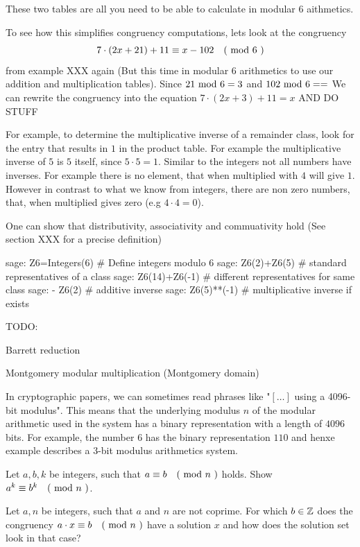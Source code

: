 \begin{example} 
These two tables are all you need to be able to calculate in modular $6$ aithmetics. 

To see how this simplifies congruency computations, lets look at the congruency 
$$7\cdot(2x+21) + 11 \equiv x-102 \quad \text{( mod } 6 \text{ )}$$
from example XXX again (But this time in modular $6$ arithmetics to use our addition and multiplication tables). Since $21 \text{ mod } 6= 3$ and $102 \text{ mod } 6= =$ We can rewrite the congruency into the equation 
$7\cdot(2x+3) + 11=x$
AND DO STUFF



For example, to determine the multiplicative inverse of a remainder class, look for the entry that results in $ 1 $ in the product table. For example the multiplicative inverse of $ 5 $ is $ 5 $ itself, since $5\cdot 5 = 1$. Similar to the integers not all numbers have inverses. For example there is no element, that when multiplied with $4$ will give $1$. 
However in contrast to what we know from integers, there are non zero numbers, that, when multiplied gives zero (e.g $4\cdot 4 =0$).

One can show that distributivity, associativity and commuativity hold (See section XXX for a precise definition)

\begin{sagecommandline}
sage: Z6=Integers(6) # Define integers modulo 6 
sage: Z6(2)+Z6(5) # standard representatives of a class
sage: Z6(14)+Z6(-1) # different representatives for same class
sage: - Z6(2) # additive inverse
sage: Z6(5)**(-1) # multiplicative inverse if exists
\end{sagecommandline}
\end{example}

TODO:

Barrett reduction

Montgomery modular multiplication (Montgomery domain)

\begin{jargon} In cryptographic papers, we can sometimes read phrases like "$[\ldots]$ using a 4096-bit modulus". This means that the underlying modulus $n$ of the modular arithmetic used in the system has a binary representation with a length of $4096$ bits. For example, the number $6$ has the binary representation $110$ and henxe example describes a $3$-bit modulus arithmetics system.   
\end{jargon}
\begin{exercise}
Let $a,b,k$ be integers, such that $a \equiv b \quad \text{( mod } n \text{ )}$ holds. Show $a^k \equiv b^k \quad \text{( mod } n \text{ )}$.
\end{exercise}
\begin{exercise}
Let $a,n$ be integers, such that $a$ and $n$ are not coprime. For which $b\in\mathbb{Z}$ does the 
congruency $a\cdot x \equiv b \quad \text{( mod } n \text{ )}$ have a solution $x$ and how does the solution set look in that case?
\end{exercise}

